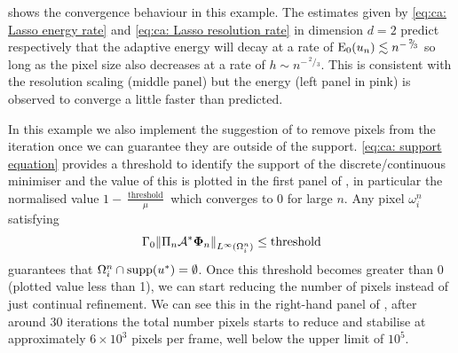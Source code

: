 \documentclass[10pt,a4paper,onecolumn]{article} \usepackage[latin1]{inputenc}
\numberwithin{equation}{section}
\newcommand{\norm}[1]{{\left\lVert #1 \right\rVert}}
\renewcommand{\sfrac}[2]{\,^{#1}\!\!/\!_{#2}}
\newcommand{\op}[1]{\operatorname{#1}}\newcommand{\overtext}[2]{\stackrel{\text{#1}}{#2}}
\renewcommand{\vec}{\mathbf}
\newcommand*{\Func}[1]{%
	\IfEqCase{#1}{%
		{0}{\op{E}}%
		{1}{\op{F}}%
		{2}{\op{G}}%
		{3}{\op{H}}%
	}[\op{F}#1]%
}
\newcommand*{\varf}[1]{%
	\IfEqCase{#1}{%
		{0}{u}%
		{1}{v}%
		{2}{w}%
	}[u#1]%
}
\newcommand*{\vard}[1]{%
	\IfEqCase{#1}{%
		{0}{\varphi}%
		{1}{\psi}%
	}[\varphi #1]%
}
\newcommand*{\vars}[1]{%
	\IfEqCase{#1}{%
		{0}{\alpha}%
		{1}{\beta}%
		{2}{\gamma}%
		{3}{a}%
		{4}{b}%
		{5}{c}%
	}[k#1]%
}
\newcommand*{\data}[1]{%
	\IfEqCase{#1}{%
		{0}{\eta}%
		{1}{\nu}%
	}[g]%
}
\newcommand{\domain}{\omega}
\newcommand{\meshsize}{h}
\newcommand*{\vvard}[1]{\vec{\vard{#1}}}\newcommand*{\vdata}[1]{\vec{\data{#1}}}
\begin{document}
 shows the convergence behaviour in this example. The estimates given by \eqref{eq:ca: Lasso energy rate} and \eqref{eq:ca: Lasso resolution rate} in dimension $d=2$ predict respectively that the adaptive energy will decay at a rate of $\Func0_0(\varf0_n)\lesssim n^{-\sfrac23}$ so long as the pixel size also decreases at a rate of $\meshsize\sim n^{-\sfrac23}$. This is consistent with the resolution scaling (middle panel) but the energy (left panel in pink) is observed to converge a little faster than predicted. 

In this example we also implement the suggestion of  to remove pixels from the iteration once we can guarantee they are outside of the support. \eqref{eq:ca: support equation} provides a threshold to identify the support of the discrete/continuous minimiser and the value of this is plotted in the first panel of , in particular the normalised value $1-\frac{\op{threshold}}{\mu}$ which converges to 0 for large $n$. Any pixel $\domain_i^n$ satisfying 
$$ \vars2_0\norm{\Pi_n\A^*\vvard0_n}_{L^\infty(\domain_i^n)} \leq \op{threshold}$$
guarantees that $\domain_i^n\cap\op{supp}(\varf0^*) = \emptyset$. Once this threshold becomes greater than 0 (plotted value less than 1), we can start reducing the number of pixels instead of just continual refinement. We can see this in the right-hand panel of , after around 30 iterations the total number pixels starts to reduce and stabilise at approximately $6\times10^3$ pixels per frame, well below the upper limit of $10^5$.
\end{document}

